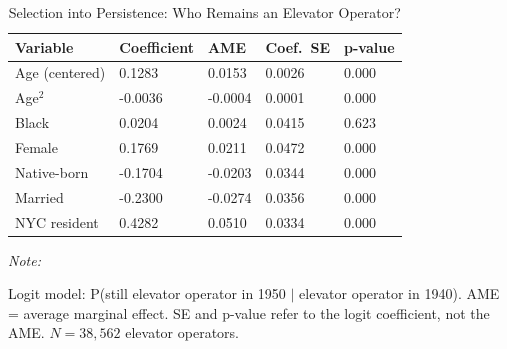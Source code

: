 \begin{table}[!h]
\centering
\caption{Selection into Persistence: Who Remains an Elevator Operator?}
\centering
\begin{threeparttable}
\begin{tabular}[t]{lllll}
\toprule
Variable & Coefficient & AME & Coef.\ SE & p-value\\
\midrule
Age (centered) & 0.1283 & 0.0153 & 0.0026 & 0.000\\
Age$^2$ & -0.0036 & -0.0004 & 0.0001 & 0.000\\
Black & 0.0204 & 0.0024 & 0.0415 & 0.623\\
Female & 0.1769 & 0.0211 & 0.0472 & 0.000\\
Native-born & -0.1704 & -0.0203 & 0.0344 & 0.000\\
\addlinespace
Married & -0.2300 & -0.0274 & 0.0356 & 0.000\\
NYC resident & 0.4282 & 0.0510 & 0.0334 & 0.000\\
\bottomrule
\end{tabular}
\begin{tablenotes}
\item \textit{Note: } 
\item Logit model: P(still elevator operator in 1950 $|$ elevator operator in 1940). AME = average marginal effect. SE and p-value refer to the logit coefficient, not the AME. $N = 38{,}562$ elevator operators.
\end{tablenotes}
\end{threeparttable}
\end{table}
